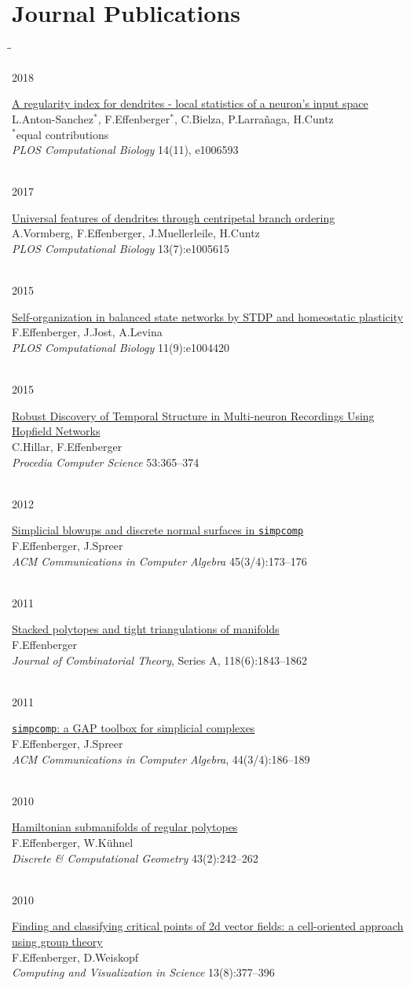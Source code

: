 \documentclass[10pt]{article} %
\newlength{\marginwidth}
\newlength{\smallertextwidth}
\newcommand{\tabbedblock}[1]{
\begin{tabbing}%
\hspace{\marginwidth}\=\hspace{\smallertextwidth}\=\kill%
#1%
\end{tabbing}
}
\newcommand{\tabitem}[2]{%
#1\>\begin{minipage}[t]{\smallertextwidth}#2\end{minipage}\\[5pt]
}
\newcommand{\publication}[5]{
\tabitem
{#1}
{%
  \href{#5}{#2}\\
  #3\\
  #4\\
}
}
\begin{document}

\section{Journal Publications}
%
\tabbedblock{
%
\publication
{2018}
{A regularity index for dendrites - local statistics of a neuron’s input space}
{L.Anton-Sanchez$^{*}$, F.Effenberger$^{*}$, C.Bielza, P.Larrañaga, H.Cuntz\\$^{*}$equal contributions}
{\textit{PLOS Computational Biology} 14(11), e1006593}
{https://journals.plos.org/ploscompbiol/article?id=10.1371/journal.pcbi.1006593}
%
\publication
{2017}
{Universal features of dendrites through centripetal branch ordering}
{A.Vormberg, F.Effenberger, J.Muellerleile, H.Cuntz}
{\textit{PLOS Computational Biology} 13(7):e1005615}
{https://journals.plos.org/ploscompbiol/article?id=10.1371/journal.pcbi.1005615}
%
\publication
{2015}
{Self-organization in balanced state networks by STDP and homeostatic plasticity}
{F.Effenberger, J.Jost, A.Levina}
{\textit{PLOS Computational Biology} 11(9):e1004420}
{http://journals.plos.org/ploscompbiol/article?id=10.1371/journal.pcbi.1004420}
%
\publication
{2015}
{Robust Discovery of Temporal Structure in Multi-neuron Recordings Using Hopfield Networks}
{C.Hillar, F.Effenberger}
{\textit{Procedia Computer Science} 53:365--374}
{http://www.sciencedirect.com/science/article/pii/S1877050915018165URL}
%
\publication
{2012}
{Simplicial blowups and discrete normal surfaces in \texttt{simpcomp}}
{F.Effenberger, J.Spreer}
{\textit{ACM Communications in Computer Algebra} 45(3/4):173--176}
{http://dl.acm.org/citation.cfm?id=2110176}
%
\publication
{2011}
{Stacked polytopes and tight triangulations of manifolds}
{F.Effenberger}
{\textit{Journal of Combinatorial Theory}, Series A, 118(6):1843--1862}
{http://www.sciencedirect.com/science/article/pii/S0097316511000537}
%
\publication
{2011}
{\texttt{simpcomp}: a GAP toolbox for simplicial complexes}
{F.Effenberger, J.Spreer}
{\textit{ACM Communications in Computer Algebra}, 44(3/4):186--189}
{http://dl.acm.org/citation.cfm?id=1940516}
%
\publication
{2010}
{Hamiltonian submanifolds of regular polytopes}
{F.Effenberger, W.Kühnel}
{\textit{Discrete \& Computational Geometry} 43(2):242--262}
{http://link.springer.com/article/10.1007/s00454-009-9151-9}
%
\publication
{2010}
{Finding and classifying critical points of 2d vector fields: a cell-oriented approach using group theory}
{F.Effenberger, D.Weiskopf}
{\textit{Computing and Visualization in Science} 13(8):377--396}
{http://link.springer.com/article/10.1007/s00791-011-0152-x}
%
}
\end{document}
